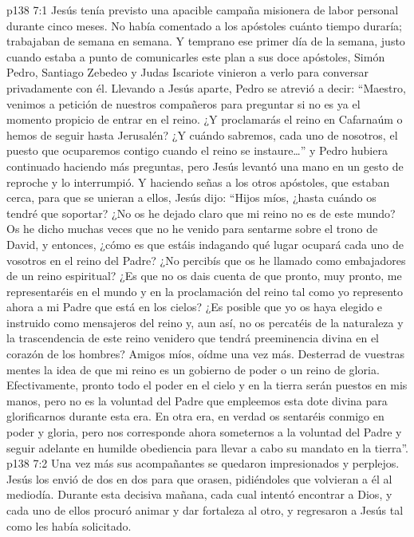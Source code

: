\vs p138 7:1 Jesús tenía previsto una apacible campaña misionera de labor personal durante cinco meses. No había comentado a los apóstoles cuánto tiempo duraría; trabajaban de semana en semana. Y temprano ese primer día de la semana, justo cuando estaba a punto de comunicarles este plan a sus doce apóstoles, Simón Pedro, Santiago Zebedeo y Judas Iscariote vinieron a verlo para conversar privadamente con él. Llevando a Jesús aparte, Pedro se atrevió a decir: “Maestro, venimos a petición de nuestros compañeros para preguntar si no es ya el momento propicio de entrar en el reino. ¿Y proclamarás el reino en Cafarnaúm o hemos de seguir hasta Jerusalén? ¿Y cuándo sabremos, cada uno de nosotros, el puesto que ocuparemos contigo cuando el reino se instaure\ldots ” y Pedro hubiera continuado haciendo más preguntas, pero Jesús levantó una mano en un gesto de reproche y lo interrumpió. Y haciendo señas a los otros apóstoles, que estaban cerca, para que se unieran a ellos, Jesús dijo: “Hijos míos, ¿hasta cuándo os tendré que soportar? ¿No os he dejado claro que mi reino no es de este mundo? Os he dicho muchas veces que no he venido para sentarme sobre el trono de David, y entonces, ¿cómo es que estáis indagando qué lugar ocupará cada uno de vosotros en el reino del Padre? ¿No percibís que os he llamado como embajadores de un reino espiritual? ¿Es que no os dais cuenta de que pronto, muy pronto, me representaréis en el mundo y en la proclamación del reino tal como yo represento ahora a mi Padre que está en los cielos? ¿Es posible que yo os haya elegido e instruido como mensajeros del reino y, aun así, no os percatéis de la naturaleza y la trascendencia de este reino venidero que tendrá preeminencia divina en el corazón de los hombres? Amigos míos, oídme una vez más. Desterrad de vuestras mentes la idea de que mi reino es un gobierno de poder o un reino de gloria. Efectivamente, pronto todo el poder en el cielo y en la tierra serán puestos en mis manos, pero no es la voluntad del Padre que empleemos esta dote divina para glorificarnos durante esta era. En otra era, en verdad os sentaréis conmigo en poder y gloria, pero nos corresponde ahora someternos a la voluntad del Padre y seguir adelante en humilde obediencia para llevar a cabo su mandato en la tierra”.
\vs p138 7:2 Una vez más sus acompañantes se quedaron impresionados y perplejos. Jesús los envió de dos en dos para que orasen, pidiéndoles que volvieran a él al mediodía. Durante esta decisiva mañana, cada cual intentó encontrar a Dios, y cada uno de ellos procuró animar y dar fortaleza al otro, y regresaron a Jesús tal como les había solicitado.
